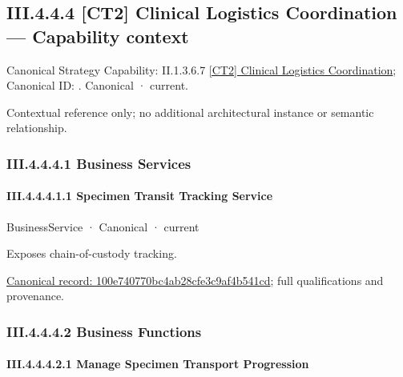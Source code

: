 \subsection*{III.4.4.4 [CT2] Clinical Logistics Coordination — Capability context}
\label{navigation:III.4.4.4}

{\small Canonical Strategy Capability: II.1.3.6.7 \hyperref[element:0c27be11b4a44cb19e992309b8146a17]{[CT2] Clinical Logistics Coordination}; Canonical ID: \texttt{}. Canonical · current.}\par
Contextual reference only; no additional architectural instance or semantic relationship.\par
\subsubsection*{III.4.4.4.1 Business Services}
\label{navigation:III.4.4.4.1}

\paragraph*{III.4.4.4.1.1 Specimen Transit Tracking Service}
\label{navigation:III.4.4.4.1.1}

\label{element:100e740770bc4ab28cfe3c9af4b541cd}
{\small BusinessService · Canonical · current}\par

Exposes chain-of-custody tracking.


{\footnotesize \href{../../../../continuum/business/business-service/100e740770bc4ab28cfe3c9af4b541cd.md}{Canonical record: 100e740770bc4ab28cfe3c9af4b541cd}; full qualifications and provenance.}\par
\subsubsection*{III.4.4.4.2 Business Functions}
\label{navigation:III.4.4.4.2}

\paragraph*{III.4.4.4.2.1 Manage Specimen Transport Progression}
\label{navigation:III.4.4.4.2.1}

